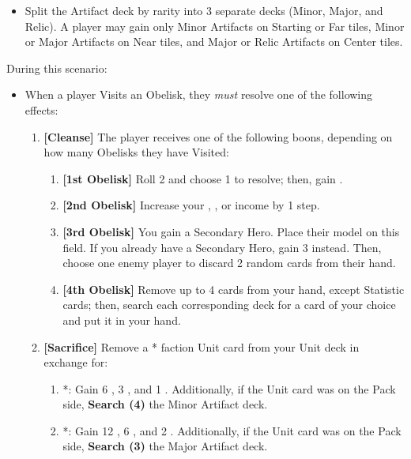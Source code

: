 \begin{multicols*}{2}
\begin{itemize}
    \item Split the Artifact deck by rarity into 3 separate decks (Minor, Major, and Relic). A player may gain only Minor Artifacts on Starting or Far tiles, Minor or Major Artifacts on Near tiles, and Major or Relic Artifacts on Center tiles.
\end{itemize}

During this scenario:

\begin{itemize}
    \item When a player Visits an Obelisk, they \textit{must} resolve one of the following effects:
    \begin{enumerate}[leftmargin=15pt]
        \item \textbf{[Cleanse]} The player receives one of the following boons, depending on how many Obelisks they have Visited:
        \begin{enumerate}
            \item \textbf{[1st Obelisk]} Roll 2  and choose 1 to resolve; then, gain .
            \item \textbf{[2nd Obelisk]} Increase your , , or  income by 1 step.
            \item \textbf{[3rd Obelisk]} You gain a Secondary Hero. Place their model on this field. If you already have a Secondary Hero, gain 3  instead. Then, choose one enemy player to discard 2 random cards from their hand.
            \item \textbf{[4th Obelisk]} Remove up to 4 cards from your hand, except Statistic cards; then, search each corresponding deck for a card of your choice and put it in your hand.
        \end{enumerate}
        \item \textbf{[Sacrifice]} Remove a * faction Unit card from your Unit deck in exchange for:
        \begin{enumerate}
            \item *: Gain 6 , 3 , and 1 . Additionally, if the Unit card was on the Pack side, \textbf{Search (4)} the Minor Artifact deck.
            \item *: Gain 12 , 6 , and 2 . Additionally, if the Unit card was on the Pack side, \textbf{Search (3)} the Major Artifact deck.

\end{enumerate}
\end{enumerate}
\end{itemize}
\end{multicols*}

